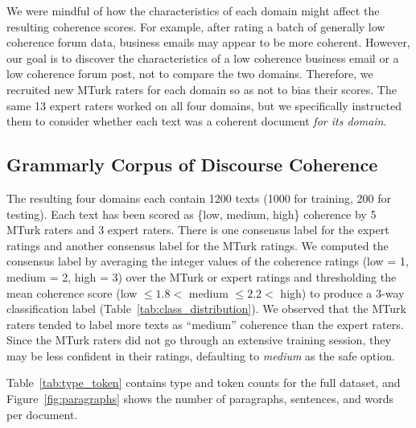 \documentclass[11pt,a4paper]{article}
\begin{document}
We were mindful of how the characteristics of each domain might affect the resulting coherence scores. For example, after rating a batch of generally low coherence forum data, business emails may appear to be more coherent. However, our goal is to discover the characteristics of a low coherence business email or a low coherence forum post, not to compare the two domains. Therefore, we recruited new MTurk raters for each domain so as not to bias their scores. The same 13 expert raters worked on all four domains, but we specifically instructed them to consider whether each text was a coherent document \textit{for its domain}.







\subsection{Grammarly Corpus of Discourse Coherence}




The resulting four domains each contain 1200 texts (1000 for training, 200 for testing). Each text has been scored as \{low, medium, high\} coherence by 5 MTurk raters and 3 expert raters. There is one consensus label for the expert ratings and another consensus label for the MTurk ratings. We computed the consensus label by averaging the integer values of the coherence ratings (low = 1, medium = 2, high = 3) over the MTurk or expert ratings and thresholding the mean coherence score (low $\leq 1.8 <$ medium $\leq 2.2 <$ high) to produce a 3-way classification label (Table~\ref{tab:class_distribution}). We observed that the MTurk raters tended to label more texts as ``medium'' coherence than the expert raters. Since the MTurk raters did not go through an extensive training session, they may be less confident in their ratings, defaulting to \textit{medium} as the safe option.


Table~\ref{tab:type_token} contains type and token counts for the full dataset, and Figure~\ref{fig:paragraphs} shows the number of paragraphs, sentences, and words per document.
\end{document}
